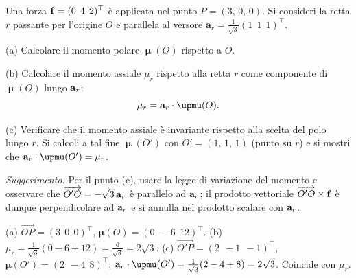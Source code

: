 \begin{esercizio}
	\label{ex:A03_momento_assiale}
	
	Una forza $\mathbf{f} = (0\;\,4\;\,2)^\top$ è applicata nel punto $P = (3,\,0,\,0)$. Si consideri la retta $r$ passante per l'origine $O$ e parallela al versore $\bm{a}_r = \frac{1}{\sqrt{3}}(1\;\,1\;\,1)^\top$.
	
	(a) Calcolare il momento polare $\bm{\upmu}(O)$ rispetto a $O$.
	
	(b) Calcolare il momento assiale $\mu_r$ rispetto alla retta $r$ come componente di $\bm{\upmu}(O)$ lungo $\mathbf{a}_r$:
	\begin{equation*}
		\mu_r = \ab_r \cdot \bm{\upmu}(O).
	\end{equation*}
	
	(c) Verificare che il momento assiale è invariante rispetto alla scelta del polo lungo $r$. Si calcoli a tal fine $\bm{\upmu}(O')$ con $O' = (1,\,1,\,1)$ (punto su $r$) e si mostri che $\ab_r \cdot \bm{\upmu}(O') = \mu_r$.
	
	\textit{Suggerimento.} Per il punto (c), usare la legge di variazione del momento e osservare che $\overrightarrow{O'O} = -\sqrt{3}\,\mathbf{a}_r$ è parallelo ad $\mathbf{a}_r$; il prodotto vettoriale $\overrightarrow{O'O} \times \mathbf{f}$ è dunque perpendicolare ad $\mathbf{a}_r$ e si annulla nel prodotto scalare con $\mathbf{a}_r$.
	
	\risultato (a) $\overrightarrow{OP} = (3\;\,0\;\,0)^\top$, $\bm{\mu}(O) = (0\;\,-6\;\,12)^\top$. (b) $\mu_r = \frac{1}{\sqrt{3}}(0 - 6 + 12) = \frac{6}{\sqrt{3}} = 2\sqrt{3}$. (c) $\overrightarrow{O'P} = (2\;\,-1\;\,-1)^\top$, $\bm{\mu}(O') = (2\;\,-4\;\,8)^\top$; $\ab_r \cdot \bm{\upmu}(O') = \frac{1}{\sqrt{3}}(2-4+8) = 2\sqrt{3}$. Coincide con $\mu_r$.
	
\end{esercizio}

